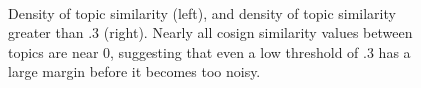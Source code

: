 \documentclass[10pt]{article}
\begin{document}
   
\begin{figure}
\centering
\mbox{
}
\caption{Density of topic similarity (left), and density of topic similarity greater than .3 (right).  Nearly all cosign similarity values between topics are near 0, suggesting that even a low threshold of .3 has a large margin before it becomes too noisy.}
\end{figure}
\end{document}
